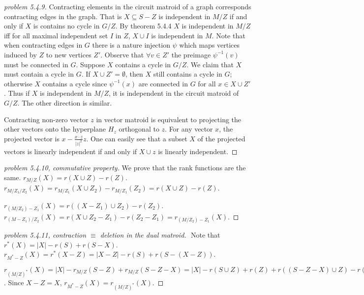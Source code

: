 \documentclass[12pt]{article}
\begin{document}
\begin{proof}[problem 5.4.9]
    Contracting elements in the circuit matroid of a graph corresponds contracting edges in the graph. That is $X\subseteq S-Z$ is independent in $M/Z$ if and only if $X$ is contains no cycle in $G/Z$. By theorem 5.4.4 $X$ is independent in $M/Z$ iff for all maximal independent set $I$ in $Z$, $X\cup I$ is independent in $M$. Note that when contracting edges in $G$ there is a nature injection $\psi$ which maps vertices induced by $Z$ to new vertices $Z'$. Observe that $\forall v\in Z'$ the preimage $\psi^{-1}(v)$ must be connected in $G$. Suppose $X$ contains a cycle in $G/Z$. We claim that $X$ must contain a cycle in $G$. If $X\cup Z'= \emptyset$, then $X$ still contains a cycle in $G$; otherwise $X$ contains a cycle since $\psi^{-1}(x)$ are connected in $G$ for all $x\in X\cup Z'$. Thus if $X$ is independent in $M/Z$, it is independent in the circuit matroid of $G/Z$. The other direction is similar.

    Contracting non-zero vector $z$ in vector matroid is equivalent to projecting the other vectors onto the hyperplane $H_z$ orthogonal to $z$. For any vector $x$, the projected vector is $x-\frac{x\cdot z}{|z|^2}z$. One can easily see that a subset $X$ of the projected vectors is linearly independent if and only if $X\cup z$ is linearly independent.
\end{proof}

\begin{proof}[problem 5.4.10, commutative property]
    We prove that the rank functions are the same.
    $r_{M/Z}(X)=r(X\cup Z)-r(Z)$. $r_{M/Z_1/Z_2}(X)=r_{M/Z_1}(X\cup Z_2)-r_{M/Z_1}(Z_2)=r(X\cup Z)-r(Z)$.

    $r_{(M/Z_2)-Z_1}(X)=r((X-Z_1)\cup Z_2)-r(Z_2)$. $r_{(M-Z_1)/Z_2}(X)=r(X\cup Z_2 -Z_1)-r(Z_2-Z_1)=r_{(M/Z_2)-Z_1}(X)$.
\end{proof}
\begin{proof}[problem 5.4.11, contraction $\equiv$ deletion in the dual matroid]
    $ $
    \newline
    Note that $r^*(X)=|X|-r(S)+r(S-X)$. $r_{M^*-Z}(X)=r^*(X-Z)=|X-Z|-r(S)+r(S-(X-Z))$.

    $r_{(M/Z)^*}(X)=|X|-r_{M/Z}(S-Z)+r_{M/Z}(S-Z-X)=|X|-r(S\cup Z)+r(Z)+r((S-Z-X)\cup Z)-r(Z)=|X|-r(S)+r(S-(X-Z))$. Since $X-Z=X$, $r_{M^*-Z}(X)=r_{(M/Z)^*}(X)$.
\end{proof}
\end{document}
